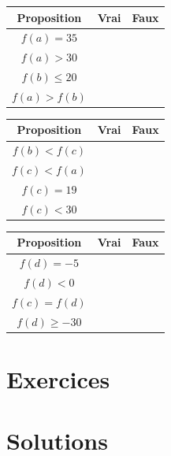 {\begin{center}
	\def\arraystretch{1.5}
	\setlength\tabcolsep{6pt}
	\begin{tabular}{|c|c|c|} \hline
		Proposition & Vrai & Faux \\ \hline
		$f(a) = 35$ & & \checkmark \\ \hline
		$f(a) > 30$ & \checkmark & \\ \hline
		$f(b) \leq 20$ & \checkmark & \\ \hline
		$f(a) > f(b)$ & \checkmark & \\ \hline
	\end{tabular}	
	\hfill
	\begin{tabular}{|c|c|c|} \hline
		Proposition & Vrai & Faux \\ \hline
		$f(b) < f(c)$ & \checkmark & \\ \hline
		$f(c) < f(a)$ & \checkmark & \\ \hline
		$f(c) = 19$ & & \checkmark \\ \hline
		$f(c) < 30$ & \checkmark & \\ \hline
	\end{tabular}
	\hfill
	\begin{tabular}{|c|c|c|} \hline
		Proposition & Vrai & Faux \\ \hline
		$f(d) = -5$ & & \checkmark \\ \hline
		$f(d) < 0$ & & \checkmark \\ \hline
		$f(c) = f(d)$ & & \checkmark \\ \hline
		$f(d) \geq -30$ & \checkmark & \\ \hline
	\end{tabular}	
	
	\end{center}

}




\section*{Exercices}

\shipoutExercise

\section*{Solutions}

\shipoutAnswer





